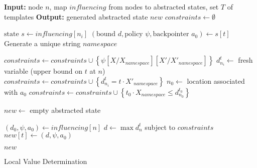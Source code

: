\documentclass{llncs}
\newcommand{\setof}[1]{\ensuremath{\left \{{#1}\right\}}}
\newcommand{\tuple}[1]{\ensuremath{\left( #1 \right) }}
\newcommand{\union}{\cup}
\begin{document}
\begin{algorithm}[t]
\begin{algorithmic}[1]
\State \textbf{Input: } node $n$, map $\mathit{influencing}$ from nodes to abstracted states,
set $T$ of templates
\State \textbf{Output: } generated abstracted state $\mathit{new}$
\State $\mathit{constraints} \gets \emptyset$

    \State $\mbox{state } s \gets \mathit{influencing}[n_i]$
        \State $\tuple{\mbox{bound } d, \mbox{policy } \psi, \mbox{backpointer } a_0} \gets s[t]$
        \State Generate a unique string $\mathit{namespace}$

        \State $\mathit{constraints} \gets \mathit{constraints} \union \setof{
            \psi[X/X_{\mathit{namespace}}][X'/X'_{\mathit{namespace}}]
            }$
        \State $d_{n_i}^{t} \gets$ fresh variable (upper bound on $t$ at $n$)
        \State $\mathit{constraints} \gets \mathit{constraints} \union
            \setof{d_{n_i}^{t} = t \cdot X'_{\mathit{namespace}}}$
                \label{alg:value_determination:output_constraint}
        \State $n_0 \gets$ location associated with $a_0$
            \State $\mathit{constraints} \gets \mathit{constraints} \union
                \setof{t_0 \cdot X_{\mathit{namespace}} \leq d_{n_0}^{t_0}}$
                \label{alg:value_determination:input_constraint}
        \EndFor
    \EndFor
\EndFor

\State $\mathit{new} \gets$ empty abstracted state

    \State $\tuple{d_0, \psi, a_0} \gets \mathit{influencing}[n]$
    \State $d \gets \max d_{n}^t$ subject to $\mathit{constraints}$
        \label{alg:value_determination:maximization}
    \State $\mathit{new}[t] \gets \tuple{d, \psi, a_0}$
        \label{alg:value_determination:record}
\EndFor

\Return $\mathit{new}$
\end{algorithmic}
\caption{Local Value Determination}
\label{alg:value_determination}
\end{algorithm}
\end{document}
